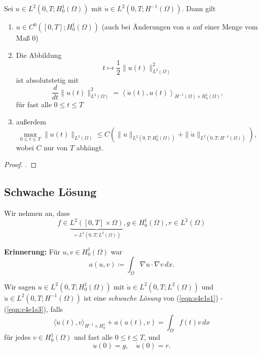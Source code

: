 \documentclass[../skript.tex]{subfiles}
\begin{document}
\begin{theorem}\label{thm:c4s2s6}
	Sei $u\in L^2(0,T;H^1_0(\Omega))$ mit $\dot{u}\in L^2(0,T;H^{-1}(\Omega))$. Dann gilt
	\begin{enumerate}
		\item $u\in C^0([0,T];H^1_0(\Omega))$ (auch bei Änderungen von $u$ auf einer Menge vom Maß $0$)
		\item Die Abbildung 
			\[
				t\mapsto \frac{1}{2} \|u(t)\|_{L^2(\Omega)}^2
			\]
			ist absolutstetig mit
			\[
				\frac{d}{dt} \|u(t)\|_{L^2(\Omega)}^2  = \left\langle \dot{u}(t),u(t)\right\rangle_{H^{-1}(\Omega)\times H^1_0(\Omega)},
			\]
			für fast alle $0\leq t\leq T$
		\item außerdem
			\[ 
				\max_{0\leq t\leq T} \|u(t)\|_{L^2(\Omega)} \leq C\left( \|u\|_{L^2(0,T;H^1_0(\Omega))} + \|\dot{u}\|_{L^2(0,T;H^{-1}(\Omega))} \right),
			\]
			wobei $C$ nur von $T$ abhängt.
	\end{enumerate}
\end{theorem}

\begin{proof}
	\cite[S.287]{Evans}.
\end{proof}


\subsection{Schwache Lösung}\label{sec:c4e3}
Wir nehmen an, dass
\begin{equation}\label{eqn:c4e3s1}
	f\in \underbrace{L^2([0,T]\times\Omega)}_{=L^2(0,T;L^2(\Omega))}, g\in H^1_0(\Omega), r\in L^2(\Omega)
\end{equation}

\textbf{Erinnerung: } Für $u,v\in H^1_0(\Omega)$ war 
\[
	a(u,v) \coloneqq \int_\Omega \nabla u\cdot\nabla v\,dx.
\]

\begin{definition}\label{def:c4e3s1}
	Wir sagen $u\in L^2(0,T;H^1_0(\Omega))$ mit $\dot{u}\in L^2(0,T;L^2(\Omega))$ und $\ddot{u}\in L^2(0,T;H^{-1}(\Omega))$ ist eine \emph{schwache Lösung} von (\ref{eqn:s4e1s1}) - (\ref{eqn:c4e1s3}), falls
	\begin{equation}\label{eqn:c4e3s2}
		\langle\ddot{u}(t),v\rangle_{H^{-1}\times H^1_0} + a(u(t),v) = \int_\Omega f(t)v\,dx
	\end{equation}
	für jedes $v\in H^1_0(\Omega)$ und fast alle $0\leq t\leq T$, und 
	\begin{equation}\label{eqn:c4e3s3}
		u(0) = g,\quad\dot{u}(0) = r.
	\end{equation}
\end{definition}
\end{document}
